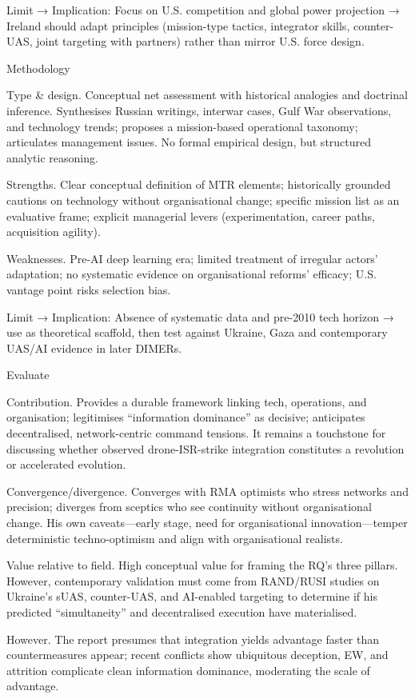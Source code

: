 Limit → Implication: Focus on U.S. competition and global power projection → Ireland should adapt principles (mission-type tactics, integrator skills, counter-UAS, joint targeting with partners) rather than mirror U.S. force design.

Methodology

Type & design. Conceptual net assessment with historical analogies and doctrinal inference. Synthesises Russian writings, interwar cases, Gulf War observations, and technology trends; proposes a mission-based operational taxonomy; articulates management issues. No formal empirical design, but structured analytic reasoning.

Strengths. Clear conceptual definition of MTR elements; historically grounded cautions on technology without organisational change; specific mission list as an evaluative frame; explicit managerial levers (experimentation, career paths, acquisition agility).

Weaknesses. Pre-AI deep learning era; limited treatment of irregular actors’ adaptation; no systematic evidence on organisational reforms’ efficacy; U.S. vantage point risks selection bias.

Limit → Implication: Absence of systematic data and pre-2010 tech horizon → use as theoretical scaffold, then test against Ukraine, Gaza and contemporary UAS/AI evidence in later DIMERs.

Evaluate

Contribution. Provides a durable framework linking tech, operations, and organisation; legitimises “information dominance” as decisive; anticipates decentralised, network-centric command tensions. It remains a touchstone for discussing whether observed drone-ISR-strike integration constitutes a revolution or accelerated evolution.

Convergence/divergence. Converges with RMA optimists who stress networks and precision; diverges from sceptics who see continuity without organisational change. His own caveats—early stage, need for organisational innovation—temper deterministic techno-optimism and align with organisational realists.

Value relative to field. High conceptual value for framing the RQ’s three pillars. However, contemporary validation must come from RAND/RUSI studies on Ukraine’s sUAS, counter-UAS, and AI-enabled targeting to determine if his predicted “simultaneity” and decentralised execution have materialised.

However. The report presumes that integration yields advantage faster than countermeasures appear; recent conflicts show ubiquitous deception, EW, and attrition complicate clean information dominance, moderating the scale of advantage.

